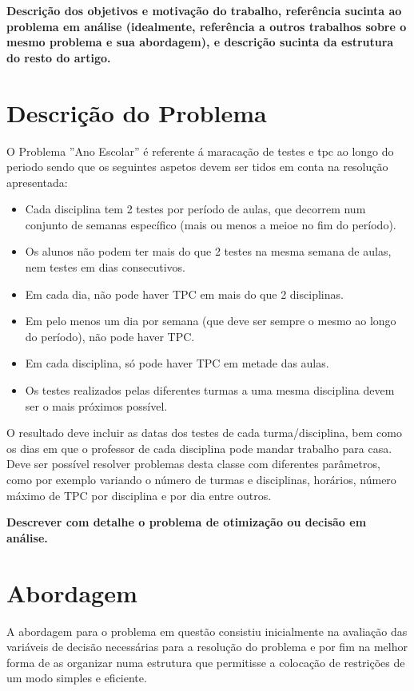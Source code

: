 \documentclass{llncs}
\begin{document}
\textbf{
Descrição dos objetivos e motivação do trabalho, referência
sucinta ao problema em análise (idealmente, referência a outros trabalhos sobre o mesmo
problema e sua abordagem), e descrição sucinta da estrutura do resto do artigo.}

\newpage
\section{Descrição do Problema}
%

O Problema ''Ano Escolar'' é referente á maracação de testes e tpc ao longo do periodo sendo que os seguintes aspetos devem ser tidos em conta na resolução apresentada:

	\begin{itemize}
	\item Cada disciplina tem 2 testes por período de aulas, que decorrem num conjunto de semanas específico (mais ou menos a meioe no fim do período). 	
	\item Os alunos não podem ter mais do que 2 testes na mesma semana de aulas, nem testes em dias consecutivos.
	\item Em cada dia, não pode haver TPC em mais do que 2 disciplinas.
	\item Em pelo menos um dia por semana (que deve ser sempre o mesmo ao longo do
	  período), não pode haver TPC. 
	\item Em cada disciplina, só pode haver TPC em metade das aulas.
	\item Os testes realizados pelas diferentes turmas a uma
		mesma disciplina devem ser o mais próximos possível.
	\end{itemize}
O resultado deve incluir as datas dos testes de cada turma/disciplina, bem como os dias em que o professor de cada
disciplina pode mandar trabalho para casa.
Deve ser possível resolver problemas desta classe com diferentes parâmetros, como por exemplo variando o número de turmas e disciplinas, horários, número máximo de TPC por disciplina e por dia entre outros.


\textbf{
Descrever com detalhe o problema de otimização ou decisão em análise.}

\section{Abordagem}
%
A abordagem para o problema em questão consistiu inicialmente na avaliação das variáveis de decisão necessárias para a resolução do problema e por fim na melhor forma de as organizar numa estrutura que permitisse a colocação de restrições de um modo simples e eficiente.
\end{document}
